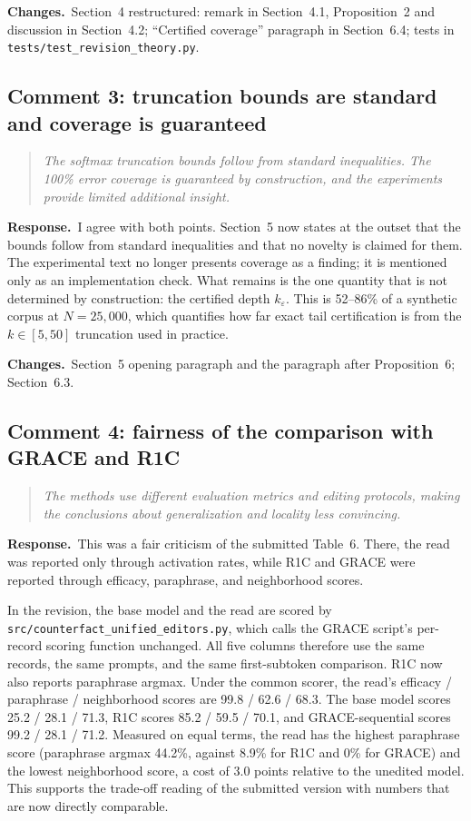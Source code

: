 \documentclass[11pt]{article}
\newenvironment{reviewer}{\par\medskip\noindent\begin{quote}\itshape}{\end{quote}}
\newcommand{\response}{\par\noindent\textbf{Response.}\ }
\newcommand{\changes}{\par\smallskip\noindent\textbf{Changes.}\ }
\begin{document}
\changes Section~4 restructured: remark in Section~4.1, Proposition~2 and discussion in Section~4.2; ``Certified coverage'' paragraph in Section~6.4; tests in \texttt{tests/test\_revision\_theory.py}.

\subsection*{Comment 3: truncation bounds are standard and coverage is guaranteed}

\begin{reviewer}
The softmax truncation bounds follow from standard inequalities. The 100\% error coverage is guaranteed by construction, and the experiments provide limited additional insight.
\end{reviewer}

\response I agree with both points. Section~5 now states at the outset that the bounds follow from standard inequalities and that no novelty is claimed for them. The experimental text no longer presents coverage as a finding; it is mentioned only as an implementation check. What remains is the one quantity that is not determined by construction: the certified depth $k_\varepsilon$. This is 52--86\% of a synthetic corpus at $N=25{,}000$, which quantifies how far exact tail certification is from the $k\in[5,50]$ truncation used in practice.

\changes Section~5 opening paragraph and the paragraph after Proposition~6; Section~6.3.

\subsection*{Comment 4: fairness of the comparison with GRACE and R1C}

\begin{reviewer}
The methods use different evaluation metrics and editing protocols, making the conclusions about generalization and locality less convincing.
\end{reviewer}

\response This was a fair criticism of the submitted Table~6. There, the read was reported only through activation rates, while R1C and GRACE were reported through efficacy, paraphrase, and neighborhood scores.

In the revision, the base model and the read are scored by \texttt{src/counterfact\_unified\_editors.py}, which calls the GRACE script's per-record scoring function unchanged. All five columns therefore use the same records, the same prompts, and the same first-subtoken comparison. R1C now also reports paraphrase argmax. Under the common scorer, the read's efficacy / paraphrase / neighborhood scores are 99.8 / 62.6 / 68.3. The base model scores 25.2 / 28.1 / 71.3, R1C scores 85.2 / 59.5 / 70.1, and GRACE-sequential scores 99.2 / 28.1 / 71.2. Measured on equal terms, the read has the highest paraphrase score (paraphrase argmax 44.2\%, against 8.9\% for R1C and 0\% for GRACE) and the lowest neighborhood score, a cost of 3.0 points relative to the unedited model. This supports the trade-off reading of the submitted version with numbers that are now directly comparable.
\end{document}
